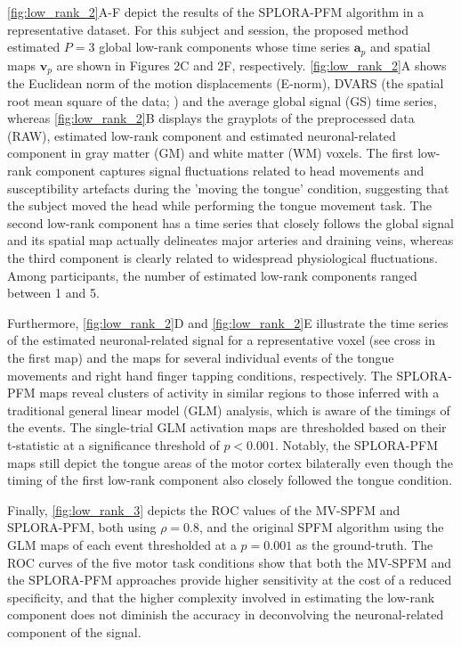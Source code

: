 \cref{fig:low_rank_2}A-F depict the results of the SPLORA-PFM algorithm in a
representative dataset. For this subject and session, the proposed method
estimated $P=3$ global low-rank components whose time series $\mathbf{a}_p$ and
spatial maps $\mathbf{v}_p$ are shown in Figures 2C and 2F, respectively.
\cref{fig:low_rank_2}A shows the Euclidean norm of the motion displacements
(E-norm), DVARS (the spatial root mean square of the data;
\cite{Smyser2011FunctionalconnectivityMRI,Power2012Spurioussystematiccorrelations})
and the average global signal (GS) time series, whereas \cref{fig:low_rank_2}B
displays the grayplots of the preprocessed data (RAW), estimated low-rank
component and estimated neuronal-related component in gray matter (GM) and white
matter (WM) voxels. The first low-rank component captures signal fluctuations
related to head movements and susceptibility artefacts during the 'moving the
tongue' condition, suggesting that the subject moved the head while performing
the tongue movement task. The second low-rank component has a time series that
closely follows the global signal and its spatial map actually delineates major
arteries and draining veins, whereas the third component is clearly related to
widespread physiological fluctuations. Among participants, the number of
estimated low-rank components ranged between 1 and 5.

Furthermore, \cref{fig:low_rank_2}D and \cref{fig:low_rank_2}E illustrate the
time series of the estimated neuronal-related signal for a representative voxel
(see cross in the first map) and the maps for several individual events of the
tongue movements and right hand finger tapping conditions, respectively. The
SPLORA-PFM maps reveal clusters of activity in similar regions to those inferred
with a traditional general linear model (GLM) analysis, which is aware of the
timings of the events. The single-trial GLM activation maps are thresholded
based on their t-statistic at a significance threshold of $p < 0.001$. Notably,
the SPLORA-PFM maps still depict the tongue areas of the motor cortex
bilaterally even though the timing of the first low-rank component also closely
followed the tongue condition.

Finally, \cref{fig:low_rank_3} depicts the ROC values of the MV-SPFM and
SPLORA-PFM, both using $\rho=0.8$, and the original SPFM algorithm using the GLM
maps of each event thresholded at a $p = 0.001$ as the ground-truth. The ROC
curves of the five motor task conditions show that both the MV-SPFM and the
SPLORA-PFM approaches provide higher sensitivity at the cost of a reduced
specificity, and that the higher complexity involved in estimating the low-rank
component does not diminish the accuracy in deconvolving the neuronal-related
component of the signal. 

